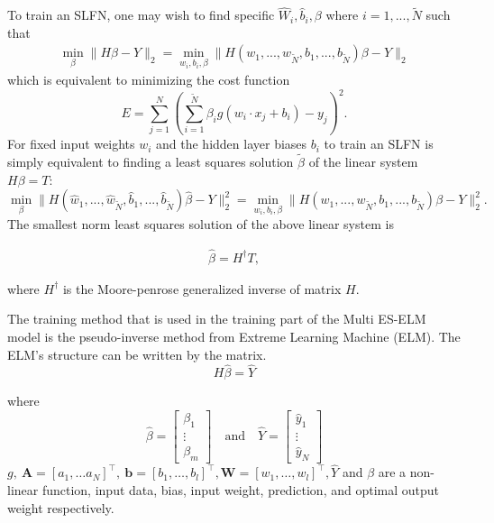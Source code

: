To train an SLFN, one may wish to find specific $\hat{W}_i,\hat{b}_i,\beta$ where $i=1,...,\tilde{N}$ such that 
\begin{align}
\min_{\beta}\|H\beta-Y\|_2=\min_{w_i,b_i,\beta}\|H(w_1,...,w_{\tilde{N}},b_1,...,b_{\tilde{N}})\beta-Y\|_2
\end{align}
which is equivalent to minimizing the cost function
\begin{equation}
E=\sum\limits_{j=1}^N\left(\sum\limits_{i=1}^{\tilde{N}}\beta_ig(w_i\cdot x_j+b_i)-y_j\right)^2.
\end{equation}
For fixed input weights $w_i$ and the hidden layer biases $b_i$ to train an SLFN is simply equivalent to finding a least squares solution $\tilde{\beta}$ of the linear system $H\beta=T$:
\begin{equation}
\min_{\beta}\|H(\hat{w}_1,...,\hat{w}_{\tilde{N}},\hat{b}_1,..., \hat{b}_{\tilde{N}})\hat{\beta}-Y\|_2^2=\min_{w_i,b_i,\beta}\|H(w_1,...,w_{\tilde{N}},b_1,...,b_{\tilde{N}})\beta-Y\|_2^2.
\end{equation}
The smallest norm least squares solution of the above linear system is 

\begin{align}
\hat{\beta}=H^{\dag}T, 
\end{align}

where $H^{\dag}$ is the Moore-penrose generalized inverse of matrix $H$.

The training method that is used in the training part of the Multi ES-ELM model is the pseudo-inverse method from Extreme Learning Machine (ELM).  The ELM's structure can be written by the matrix.
\begin{equation*}
    H\hat\beta = \hat Y
\end{equation*}

where 
\begin{equation*}
    \hat\beta = 
    \begin{bmatrix}
    \beta_1\\
    \vdots\\
    \beta_m
    \end{bmatrix}\quad \text{and}\quad
    \hat Y = 
    \begin{bmatrix}
    \hat y_1\\
    \vdots\\
    \hat y_N
    \end{bmatrix}
\end{equation*}
$g,\ \mathbf{A} = [a_1, \ldots a_N]^\top,\ \mathbf{b} = [b_1,\ldots, b_l]^\top, \mathbf{W} = [w_1,\ldots, w_l]^\top, \hat Y$ and $\beta$  are a non-linear function, input data, bias, input weight, prediction, and optimal output weight respectively.

